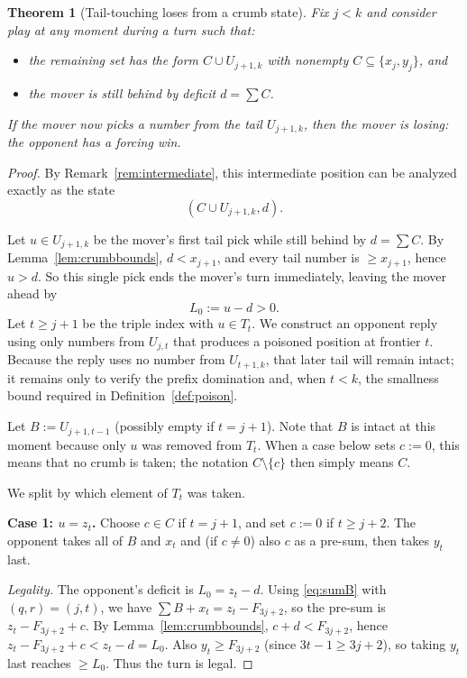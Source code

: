 \documentclass[11pt]{article}
\newtheorem{theorem}{Theorem}[section]
\begin{document}
\begin{theorem}[Tail-touching loses from a crumb state]\label{thm:crumb-tail}
Fix $j<k$ and consider play at any moment during a turn such that:
\begin{itemize}
\item the remaining set has the form $C\cup U_{j+1,k}$ with nonempty $C\subseteq\{x_j,y_j\}$, and
\item the mover is still behind by deficit $d=\sum C$.
\end{itemize}
If the mover now picks a number from the tail $U_{j+1,k}$, then the mover is losing: the opponent has a forcing win.
\end{theorem}

\begin{proof}
By Remark~\ref{rem:intermediate}, this intermediate position can be analyzed exactly as the state
\[
(C\cup U_{j+1,k},d).
\]

Let $u\in U_{j+1,k}$ be the mover's first tail pick while still behind by $d=\sum C$.
By Lemma~\ref{lem:crumbbounds}, $d<x_{j+1}$, and every tail number is $\ge x_{j+1}$, hence $u>d$.
So this single pick ends the mover's turn immediately, leaving the mover ahead by
\[
L_0:=u-d>0.
\]
Let $t\ge j+1$ be the triple index with $u\in T_t$.
We construct an opponent reply using only numbers from $U_{j,t}$ that produces a poisoned position at frontier $t$.
Because the reply uses no number from $U_{t+1,k}$, that later tail will remain intact; it remains only to verify the prefix domination
and, when $t<k$, the smallness bound required in Definition~\ref{def:poison}.

Let $B:=U_{j+1,t-1}$ (possibly empty if $t=j+1$). Note that $B$ is intact at this moment because only $u$ was removed from $T_t$.
When a case below sets $c:=0$, this means that no crumb is taken; the notation $C\setminus\{c\}$ then simply means $C$.

We split by which element of $T_t$ was taken.

\medskip\noindent
\textbf{Case 1: $u=z_t$.}
Choose $c\in C$ if $t=j+1$, and set $c:=0$ if $t\ge j+2$.
The opponent takes all of $B$ and $x_t$ and (if $c\ne 0$) also $c$ as a pre-sum, then takes $y_t$ last.

\smallskip\noindent
\emph{Legality.}
The opponent's deficit is $L_0=z_t-d$.
Using \eqref{eq:sumB} with $(q,r)=(j,t)$, we have $\sum B+x_t=z_t-F_{3j+2}$, so the pre-sum is $z_t-F_{3j+2}+c$.
By Lemma~\ref{lem:crumbbounds}, $c+d<F_{3j+2}$, hence $z_t-F_{3j+2}+c<z_t-d=L_0$.
Also $y_t\ge F_{3j+2}$ (since $3t-1\ge 3j+2$), so taking $y_t$ last reaches $\ge L_0$.
Thus the turn is legal.


\end{proof}
\end{document}
